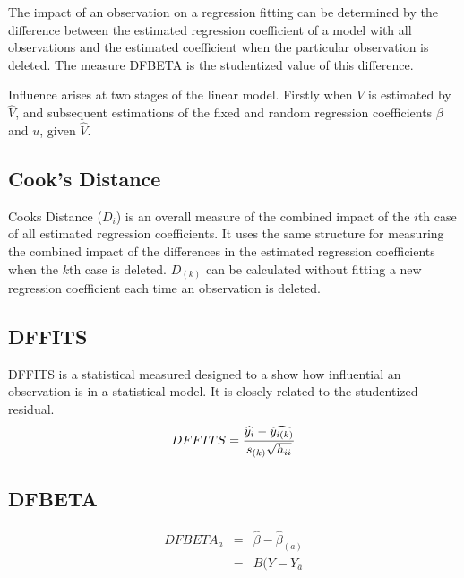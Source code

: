 \documentclass[12pt, a4paper]{report}
\begin{document}
The impact of an observation on a regression fitting can be determined by the difference between the estimated regression coefficient of a model with all observations and the estimated coefficient when the particular observation is deleted. The measure DFBETA is the studentized value of this difference.

Influence arises at two stages of the linear model. Firstly when $V$ is estimated by $\hat{V}$, and subsequent
estimations of the fixed and random regression coefficients $\beta$ and $u$, given $\hat{V}$.

\subsection{Cook's Distance}%
Cooks Distance ($D_{i}$) is an overall measure of the combined impact of the $i$th case of all estimated regression coefficients. It uses the same structure for measuring the combined impact of the differences in the estimated regression coefficients when the $k$th case is deleted. $D_{(k)}$ can be calculated without fitting
a new regression coefficient each time an observation is deleted.

\subsection{DFFITS} %
DFFITS is a statistical measured designed to a show how influential an observation is in a statistical model. It is closely related to the studentized residual.
\begin{displaymath} DFFITS = {\widehat{y_i} -
	\widehat{y_{i(k)}} \over s_{(k)} \sqrt{h_{ii}}} \end{displaymath}



	


\subsection{DFBETA} %
\begin{eqnarray}
DFBETA_{a} &=& \hat{\beta} - \hat{\beta}_{(a)} \\
&=& B(Y-Y_{\bar{a}}
\end{eqnarray}

\end{document}
